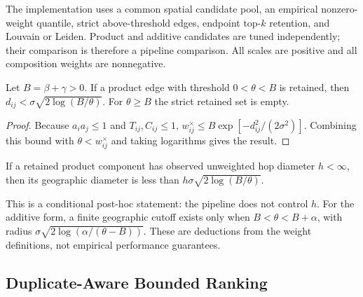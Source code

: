 \documentclass[runningheads]{llncs}
\begin{document}
The implementation uses a common spatial candidate pool, an empirical
nonzero-weight quantile, strict above-threshold edges, endpoint top-$k$
retention, and Louvain or Leiden. Product and additive candidates are tuned
independently; their comparison is therefore a pipeline comparison. All
scales are positive and all composition weights are nonnegative.

\begin{theorem}
Let $B=\beta+\gamma>0$. If a product edge with threshold $0<\theta<B$ is
retained, then
$d_{ij}<\sigma\sqrt{2\log(B/\theta)}$. For $\theta\geq B$ the strict
retained set is empty.
\end{theorem}
\begin{proof}
Because $a_ia_j\leq1$ and $T_{ij},C_{ij}\leq1$,
$w^\times_{ij}\leq B\exp[-d_{ij}^{2}/(2\sigma^2)]$. Combining this bound
with $\theta<w^\times_{ij}$ and taking logarithms gives the result.
\end{proof}

\begin{corollary}
If a retained product component has observed unweighted hop diameter $h<\infty$,
then its geographic diameter is less than
$h\sigma\sqrt{2\log(B/\theta)}$.
\end{corollary}
This is a conditional post-hoc statement: the pipeline does not control $h$.
For the additive form, a finite geographic cutoff exists only when
$B<\theta<B+\alpha$, with radius
$\sigma\sqrt{2\log(\alpha/(\theta-B))}$. These are deductions from the
weight definitions, not empirical performance guarantees.

\subsection{Duplicate-Aware Bounded Ranking}
\end{document}
